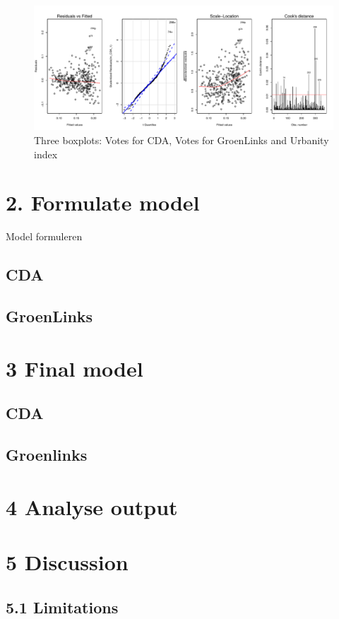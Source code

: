 \documentclass[11pt,]{article}
\begin{document}
\begin{figure}

{\centering \includegraphics{Report_files/figure-latex/unnamed-chunk-8-1} 

}

\caption{Three boxplots: Votes for CDA, Votes for GroenLinks and Urbanity index}\label{fig:unnamed-chunk-8}
\end{figure}

\section{2. Formulate model}\label{formulate-model}

Model formuleren

\subsection{CDA}\label{cda}

\subsection{GroenLinks}\label{groenlinks}

\section{3 Final model}\label{final-model}

\subsection{CDA}\label{cda-1}

\subsection{Groenlinks}\label{groenlinks-1}

\section{4 Analyse output}\label{analyse-output}

\section{5 Discussion}\label{discussion}

\subsection{5.1 Limitations}\label{limitations}
\end{document}

